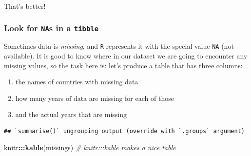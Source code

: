 \documentclass[]{book}
\newenvironment{Shaded}{\begin{snugshade}}{\end{snugshade}}
\newcommand{\KeywordTok}[1]{\textcolor[rgb]{0.13,0.29,0.53}{\textbf{#1}}}
\newcommand{\DataTypeTok}[1]{\textcolor[rgb]{0.13,0.29,0.53}{#1}}
\newcommand{\StringTok}[1]{\textcolor[rgb]{0.31,0.60,0.02}{#1}}
\newcommand{\CommentTok}[1]{\textcolor[rgb]{0.56,0.35,0.01}{\textit{#1}}}
\newcommand{\OperatorTok}[1]{\textcolor[rgb]{0.81,0.36,0.00}{\textbf{#1}}}
\newcommand{\NormalTok}[1]{#1}
\providecommand{\tightlist}{%
  \setlength{\itemsep}{0pt}\setlength{\parskip}{0pt}}
\begin{document}
That's better!

\subsubsection*{\texorpdfstring{Look for \texttt{NA}s in a
\texttt{tibble}}{Look for NAs in a tibble}}\label{look-for-nas-in-a-tibble}

Sometimes data is \emph{missing}, and \texttt{R} represents it with the
special value \texttt{NA} (not available). It is good to know where in
our dataset we are going to encounter any missing values, so the task
here is: let's produce a table that has three columns:

\begin{enumerate}
\def\labelenumi{\arabic{enumi}.}
\tightlist
\item
  the names of countries with missing data
\item
  how many years of data are missing for each of those
\item
  and the actual years that are missing
\end{enumerate}

\begin{Shaded}
\end{Shaded}

\begin{verbatim}
## `summarise()` ungrouping output (override with `.groups` argument)
\end{verbatim}

\begin{Shaded}
\begin{Highlighting}[]
\NormalTok{knitr}\OperatorTok{:::}\KeywordTok{kable}\NormalTok{(missings)  }\CommentTok{# knitr:::kable makes a nice table}
\end{Highlighting}
\end{Shaded}
\end{document}
